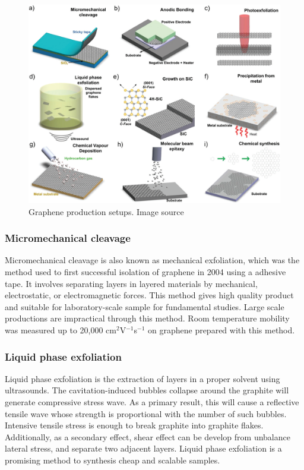 \begin{figure}[htbp!] 
\centering  
\includegraphics[width=\textwidth]{synthesis.png}
\caption{Graphene production setups. Image source \cite{Ferrari2015}}  
\label{fig:syn}
\end{figure} 
\subsubsection{Micromechanical cleavage}

Micromechanical cleavage is also known as mechanical exfoliation, which was the method used to first successful isolation of graphene in 2004 using a adhesive tape\cite{Novoselov26072005}. It involves separating layers in layered materials by mechanical, electrostatic, or electromagnetic forces. This method gives high quality product and suitable for laboratory-scale sample for fundamental studies. Large scale productions are impractical through this method.  Room temperature mobility was measured up to 20,000 cm$^2$V$^{-1}$s$^{-1}$\cite{Ni2010} on graphene prepared with this method.

\subsubsection{Liquid phase exfoliation}

Liquid phase exfoliation is the extraction of layers in a proper solvent using ultrasounds. The cavitation-induced bubbles collapse around the graphite will generate compressive stress wave. As a primary result, this will cause a reflective tensile wave whose strength is proportional with the number of such bubbles. Intensive tensile stress is enough to break graphite into graphite flakes. Additionally, as a secondary effect, shear effect can be develop from unbalance lateral stress, and separate two adjacent layers. Liquid phase exfoliation is a promising method to synthesis cheap and scalable samples. 

